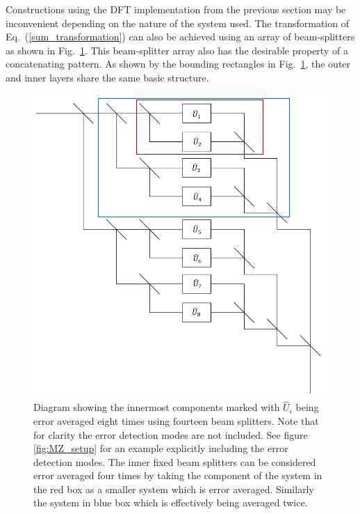 \documentclass[aps,pra,twocolumn,superscriptaddress,numerical]{revtex4-1}
\begin{document}
Constructions using the DFT implementation from the previous section may be inconvenient depending on the nature of the system used.  The transformation of Eq.~(\ref{sum_transformation}) can also be achieved using an array of beam-splitters as shown in Fig.~\ref{fig:gen system}.  This beam-splitter array also has the desirable property of a concatenating pattern.  As shown by the bounding rectangles in Fig.~\ref{fig:gen system}, the outer and inner layers share the same basic structure. 
%
\begin{figure}
	\includegraphics[width=\columnwidth]{unitaries.PNG}
	\caption{\label{fig:gen system}Diagram showing the innermost components marked with $\hat{U}_i$ being error averaged eight times using fourteen beam splitters. Note that for clarity the error detection modes are not included. See figure \ref{fig:MZ_setup} for an example explicitly including the error detection modes. The inner fixed beam splitters can be considered error averaged four times by taking the component of the system in the red box as a smaller system which is error averaged. Similarly the system in blue box which is effectively being averaged twice.}
\end{figure}
	
	
\end{document}
